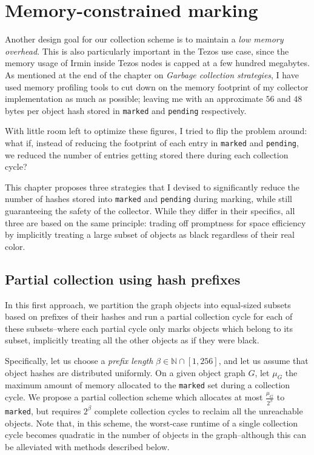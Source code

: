 \section{Memory-constrained marking}

Another design goal for our collection scheme is to maintain a \emph{low memory overhead}. This is also particularly important in the Tezos use case, since the memory usage of Irmin inside Tezos nodes is capped at a few hundred megabytes. As mentioned at the end of the chapter on \emph{Garbage collection strategies}, I have used memory profiling tools to cut down on the memory footprint of my collector implementation as much as possible; leaving me with an approximate \(56\) and \(48\) bytes per object hash stored in \texttt{marked} and \texttt{pending} respectively.

With little room left to optimize these figures, I tried to flip the problem around: what if, instead of reducing the footprint of each entry in \texttt{marked} and \texttt{pending}, we reduced the number of entries getting stored there during each collection cycle?

This chapter proposes three strategies that I devised to significantly reduce the number of hashes stored into \texttt{marked} and \texttt{pending} during marking, while still guaranteeing the safety of the collector. While they differ in their specifics, all three are based on the same principle: trading off promptness for space efficiency by implicitly treating a large subset of objects as black regardless of their real color.

\subsection{Partial collection using hash prefixes}

In this first approach, we partition the graph objects into equal-sized subsets based on prefixes of their hashes and run a partial collection cycle for each of these subsets--where each partial cycle only marks objects which belong to its subset, implicitly treating all the other objects as if they were black.

Specifically, let us choose a \emph{prefix length} \(\beta \in \mathbb{N} \cap [1, 256]\), and let us assume that object hashes are distributed uniformly. On a given object graph \(G\), let \(\mu_G\) the maximum amount of memory allocated to the \texttt{marked} set during a collection cycle. We propose a partial collection scheme which allocates at most \(\frac{\mu_G}{2^\beta}\) to \texttt{marked}, but requires \(2^\beta\) complete collection cycles to reclaim all the unreachable objects. Note that, in this scheme, the worst-case runtime of a single collection cycle becomes quadratic in the number of objects in the graph--although this can be alleviated with methods described below.

